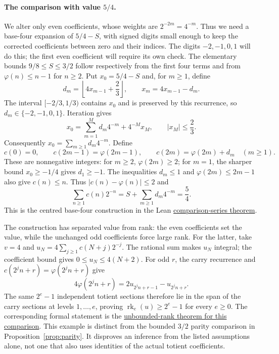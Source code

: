 \documentclass[11pt]{article}
\theoremstyle{plain}
\theoremstyle{definition}
\theoremstyle{remark}
\newcommand{\ph}{\varphi}
\begin{document}
\paragraph{The comparison with value $5/4$.}
We alter only even coefficients, whose weights are
$2^{-2m}=4^{-m}$. Thus we need a base-four expansion of $5/4-S$,
with signed digits small enough to keep the corrected coefficients
between zero and their indices. The digits $-2,-1,0,1$ will do this;
the first even coefficient will require its own check.
The elementary bounds $9/8\le S\le3/2$ follow respectively from the
first four terms and from $\ph(n)\le n-1$ for $n\ge2$.
Put $x_0=5/4-S$ and, for $m\ge1$, define
\[
 d_m=\left\lfloor4x_{m-1}+\frac23\right\rfloor,
 \qquad x_m=4x_{m-1}-d_m.
\]
The interval $[-2/3,1/3)$ contains $x_0$ and is preserved by this
recurrence, so $d_m\in\{-2,-1,0,1\}$. Iteration gives
\[
 x_0=\sum_{m=1}^{M}d_m4^{-m}+4^{-M}x_M,
 \qquad |x_M|\le\frac23.
\]
Consequently $x_0=\sum_{m\ge1}d_m4^{-m}$. Define
\[
 c(0)=0,\qquad c(2m-1)=\ph(2m-1),\qquad
 c(2m)=\ph(2m)+d_m\quad(m\ge1).
\]
These are nonnegative integers: for $m\ge2$, $\ph(2m)\ge2$;
for $m=1$, the sharper bound $x_0\ge-1/4$ gives $d_1\ge-1$.
The inequalities $d_m\le1$ and $\ph(2m)\le2m-1$ also give $c(n)\le n$.
Thus $|c(n)-\ph(n)|\le2$ and
\[
 \sum_{n\ge1}c(n)2^{-n}=S+\sum_{m\ge1}d_m4^{-m}=\frac54.
\]
This is the centred base-four construction in the Lean
\href{https://github.com/wcook04/plectis-erdos-lean/blob/52f29ad173b04e3bac941b3663f2b9aebe5de0bb/ErdosProblems/Erdos249/ParityPerturbedRationalControl.lean#L379}{comparison-series theorem}.

The construction has separated value from rank: the even coefficients
set the value, while the unchanged odd coefficients force large rank.
For the latter, take $v=4$ and
$u_N=4\sum_{j\ge1}c(N+j)2^{-j}$. The rational sum makes $u_N$ integral;
the coefficient bound gives $0\le u_N\le4(N+2)$. For odd $r$, the
carry recurrence and $c(2^jn+r)=\ph(2^jn+r)$ give
\[
 4\ph(2^j n+r)=2u_{2^j n+r-1}-u_{2^j n+r}.
\]
The same $2^e-1$ independent totient sections therefore lie in the
span of the carry sections at levels $1,\ldots,e$, proving
$\operatorname{rk}_e(u)\ge2^e-1$ for every $e\ge0$.
The corresponding formal statement is the
\href{https://github.com/wcook04/plectis-erdos-lean/blob/52f29ad173b04e3bac941b3663f2b9aebe5de0bb/ErdosProblems/Erdos249/ParityPerturbedRationalControl.lean#L478}{unbounded-rank theorem for this comparison}.
This example is distinct from the bounded $3/2$ parity comparison in
Proposition~\ref{prop:parity}. It disproves an inference from the listed
assumptions alone, not one that also uses identities of the actual
totient coefficients.
\end{document}
